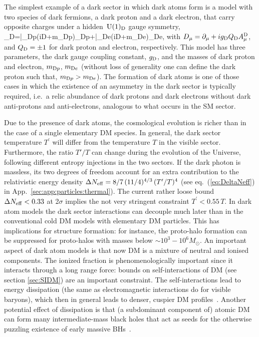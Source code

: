 The simplest example of a dark sector in which dark atoms form is a model with two species of dark fermions, a dark proton and a dark electron, that carry opposite charges under a hidden $\,{\rm U}(1)_{\rm D}$ gauge symmetry, 
\beq
\label{eq:Lag:dark:atom}
\Lag_{\rm D}=\bar \Psi_{{\rm D}p}\big(i\slashed D+m_{{\rm D}p}\big)\Psi_{{\rm D}p}+\bar \Psi_{{\rm D}e}\big(i\slashed D+m_{{\rm D}e}\big)\Psi_{{\rm D}e},
\eeq
with $D_\mu=\partial_\mu+ i g_{\rm D} Q_{\rm D} A_\mu^{\rm D}$, and $Q_{\rm D}=\pm1$ 
for dark proton and electron, respectively. 
This model has three parameters, the dark gauge coupling constant, $g_{\rm D}$, 
and the masses of dark proton and electron, $m_{{\rm D}p}$, $m_{{\rm D}e}$ (without loss of generality one can define the dark proton such that, $m_{{\rm D}p}> m_{{\rm D}e}$). 
The formation of dark atoms is one of those cases in which the existence of an asymmetry in the dark sector is typically required, i.e.~a relic abundance of dark protons and dark electrons without dark anti-protons and anti-electrons, analogous to what occurs in the SM sector.

\smallskip

Due to the presence of dark atoms, the cosmological evolution is richer than in the case of a single elementary DM species. 
In general, the dark sector temperature $T^\prime$ will differ from the temperature $T$ in the visible sector. Furthermore, the ratio $T'/T$ can change during the evolution of the Universe, following different entropy injections in the two sectors. If the dark photon is massless, its two degrees of freedom account for an extra contribution to the relativistic energy density $\Delta N_{\rm eff} = 8/7 \, (11/4)^{4/3}\, (T^\prime/T)^4$ (see eq.~(\ref{eq:DeltaNeff}) in App.~\ref{sec:app:particles:thermal}). The current rather loose bound $\Delta N_{\rm eff} < 0.33$ at 2$\sigma$ \cite{Planckresults} implies the not very stringent constraint $T^\prime < 0.55 \, T$.
In dark atom models the dark sector interactions can decouple much later than in the conventional cold DM models with elementary DM particles. This has implications for structure formation: for instance, the proto-halo formation can be suppressed for proto-halos with masses below $\sim 10^3-10^6 M_{\odot}$. An important aspect of dark atom models is that now DM is a mixture of neutral and ionised components. The ionized fraction is phenomenologically important since it interacts through a long range force: bounds on self-interactions of DM (see section \ref{sec:SIDM}) are an important constraint. 
The self-interactions lead to energy dissipation (the same as electromagnetic interactions do for visible baryons), which then in general leads to denser, cuspier DM profiles~\cite{dark:atoms}. Another potential effect of dissipation is that (a subdominant component of) atomic DM can form many intermediate-mass black holes that act as seeds for the otherwise puzzling existence of early massive BHs~\cite{dark:atoms}. 

